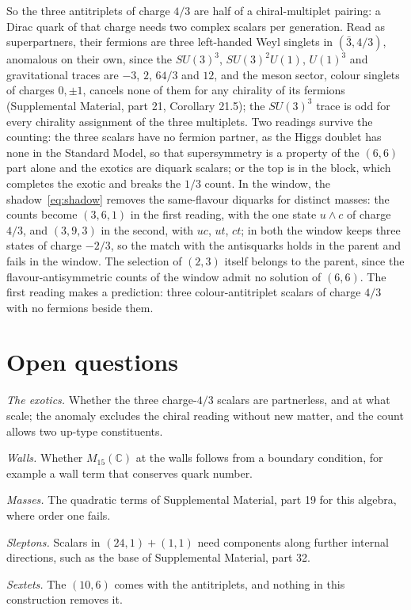 \documentclass[aps,prd,reprint,onecolumn,nofootinbib,amsmath,amssymb,floatfix]{revtex4-2}
\theoremstyle{plain}
\newcommand{\C}{\mathbb C}
\newcommand{\supp}[1]{Supplemental Material, part #1}
\begin{document}
So the three antitriplets of charge $4/3$ are half of a chiral-multiplet pairing: a Dirac quark of that charge needs two complex scalars per generation. Read as superpartners, their fermions are three left-handed Weyl singlets in $(\bar3,4/3)$, anomalous on their own, since the $SU(3)^3$, $SU(3)^2U(1)$, $U(1)^3$ and gravitational traces are $-3$, $2$, $64/3$ and $12$, and the meson sector, colour singlets of charges $0,\pm1$, cancels none of them for any chirality of its fermions (\supp{21}, Corollary 21.5); the $SU(3)^3$ trace is odd for every chirality assignment of the three multiplets. Two readings survive the counting: the three scalars have no fermion partner, as the Higgs doublet has none in the Standard Model, so that supersymmetry is a property of the $(6,6)$ part alone and the exotics are diquark scalars; or the top is in the block, which completes the exotic and breaks the $1/3$ count. In the window, the shadow~\eqref{eq:shadow} removes the same-flavour diquarks for distinct masses: the counts become $(3,6,1)$ in the first reading, with the one state $u\wedge c$ of charge $4/3$, and $(3,9,3)$ in the second, with $uc$, $ut$, $ct$; in both the window keeps three states of charge $-2/3$, so the match with the antisquarks holds in the parent and fails in the window. The selection of $(2,3)$ itself belongs to the parent, since the flavour-antisymmetric counts of the window admit no solution of $(6,6)$. The first reading makes a prediction: three colour-antitriplet scalars of charge $4/3$ with no fermions beside them.

\section{Open questions}\label{sec:open}

\textit{The exotics.} Whether the three charge-$4/3$ scalars are partnerless, and at what scale; the anomaly excludes the chiral reading without new matter, and the count allows two up-type constituents.

\textit{Walls.} Whether $M_{15}(\C)$ at the walls follows from a boundary condition, for example a wall term that conserves quark number.

\textit{Masses.} The quadratic terms of \supp{19} for this algebra, where order one fails.

\textit{Sleptons.} Scalars in $(24,1)+(1,1)$ need components along further internal directions, such as the base of \supp{32}.

\textit{Sextets.} The $(10,6)$ comes with the antitriplets, and nothing in this construction removes it.
\end{document}
